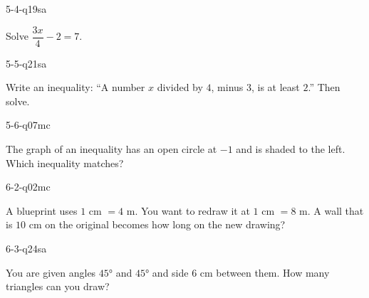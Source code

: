 \begin{practiceQuestion}{5-4-q19}{sa}
\begin{questionText}
Solve $\dfrac{3x}{4} - 2 = 7$.
\end{questionText}
\end{practiceQuestion}

\begin{practiceQuestion}{5-5-q21}{sa}
\begin{questionText}
Write an inequality: ``A number $x$ divided by $4$, minus $3$, is at least $2$.'' Then solve.
\end{questionText}
\end{practiceQuestion}

\begin{practiceQuestion}{5-6-q07}{mc}
\begin{questionText}
The graph of an inequality has an open circle at $-1$ and is shaded to the left. Which inequality matches?
\end{questionText}
\end{practiceQuestion}

\begin{practiceQuestion}{6-2-q02}{mc}
\begin{questionText}
A blueprint uses $1$ cm $= 4$ m. You want to redraw it at $1$ cm $= 8$ m. A wall that is $10$ cm on the original becomes how long on the new drawing?
\end{questionText}
\end{practiceQuestion}

\begin{practiceQuestion}{6-3-q24}{sa}
\begin{questionText}
You are given angles $45°$ and $45°$ and side $6$ cm between them. How many triangles can you draw?
\end{questionText}
\end{practiceQuestion}

